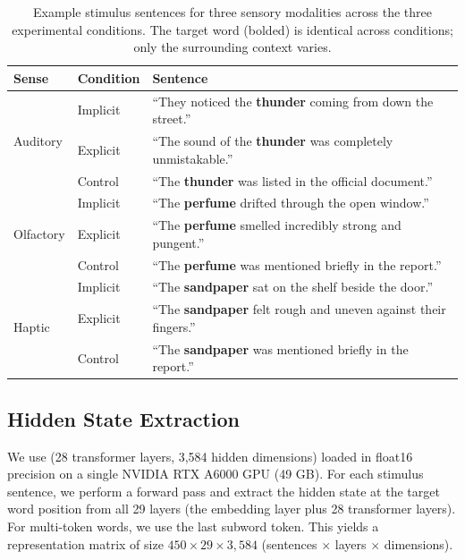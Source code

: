 \begin{table}[t]
\centering
\caption{Example stimulus sentences for three sensory modalities across the three experimental conditions. The target word (bolded) is identical across conditions; only the surrounding context varies.}
\label{tab:stimuli}
\small
\begin{tabular}{@{}llp{7.5cm}@{}}
\toprule
\textbf{Sense} & \textbf{Condition} & \textbf{Sentence} \\
\midrule
\multirow{3}{*}{Auditory} & Implicit & ``They noticed the \textbf{thunder} coming from down the street.'' \\
 & Explicit & ``The sound of the \textbf{thunder} was completely unmistakable.'' \\
 & Control & ``The \textbf{thunder} was listed in the official document.'' \\
\midrule
\multirow{3}{*}{Olfactory} & Implicit & ``The \textbf{perfume} drifted through the open window.'' \\
 & Explicit & ``The \textbf{perfume} smelled incredibly strong and pungent.'' \\
 & Control & ``The \textbf{perfume} was mentioned briefly in the report.'' \\
\midrule
\multirow{3}{*}{Haptic} & Implicit & ``The \textbf{sandpaper} sat on the shelf beside the door.'' \\
 & Explicit & ``The \textbf{sandpaper} felt rough and uneven against their fingers.'' \\
 & Control & ``The \textbf{sandpaper} was mentioned briefly in the report.'' \\
\bottomrule
\end{tabular}
\end{table}

\subsection{Hidden State Extraction}
\label{sec:extraction}

We use \qwen (28 transformer layers, 3,584 hidden dimensions) loaded in float16 precision on a single NVIDIA RTX A6000 GPU (49 GB). For each stimulus sentence, we perform a forward pass and extract the hidden state at the target word position from all 29 layers (the embedding layer plus 28 transformer layers). For multi-token words, we use the last subword token. This yields a representation matrix of size $450 \times 29 \times 3{,}584$ (sentences $\times$ layers $\times$ dimensions).

